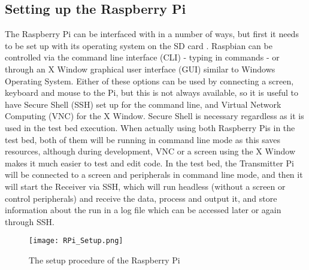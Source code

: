 \documentclass[../main.tex]{subfiles}
\begin{document}
\subsection{Setting up the Raspberry Pi}
\lstset{style=python}
The Raspberry Pi can be interfaced with in a number of ways, but first it needs to be set up with its operating system on the SD card \cite{web_SetupRaspbian}.
Raspbian can be controlled via the command line interface (CLI) - typing in commands - or through an X Window graphical user interface (GUI) similar to Windows Operating System.
Either of these options can be used by connecting a screen, keyboard and mouse to the Pi, but this is not always available, so it is useful to have Secure Shell (SSH) set up for the command line, and Virtual Network Computing (VNC) for the X Window.
Secure Shell is necessary regardless as it is used in the test bed execution.
When actually using both Raspberry Pis in the test bed, both of them will be running in command line mode as this saves resources, although during development, VNC or a screen using the X Window makes it much easier to test and edit code.
In the test bed, the Transmitter Pi will be connected to a screen and peripherals in command line mode, and then it will start the Receiver via SSH, which will run headless (without a screen or control peripherals) and receive the data, process and output it, and store information about the run in a log file which can be accessed later or again through SSH.\\

\begin{figure}[ht]
	\centering
	\texttt{[image: RPi\_Setup.png]}
	\caption{The setup procedure of the Raspberry Pi}
	\label{fig_RPi Setup}
\end{figure}
\end{document}
